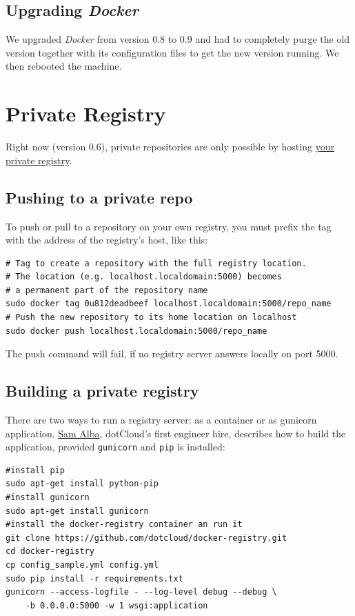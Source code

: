 \documentclass[captions=tableheading]{article}
\begin{document}
\subsection{Upgrading \emph{Docker}}
\label{sec-2-6}

We upgraded \emph{Docker} from version 0.8 to 0.9 and had to completely purge the old version together with its configuration files to get the new version running. We then rebooted the machine. 
\section{Private Registry}
\label{sec-3}

Right now (version 0.6), private repositories are only possible by hosting \href{https://github.com/dotcloud/docker-registry}{your private registry}. 
\subsection{Pushing to a private repo}
\label{sec-3-1}

To push or pull to a repository on your own registry, you must prefix the tag with the address of the registry’s host, like this:

\begin{verbatim}
# Tag to create a repository with the full registry location.
# The location (e.g. localhost.localdomain:5000) becomes
# a permanent part of the repository name
sudo docker tag 0u812deadbeef localhost.localdomain:5000/repo_name
# Push the new repository to its home location on localhost
sudo docker push localhost.localdomain:5000/repo_name
\end{verbatim}
The push command will fail, if no registry server answers locally on port 5000.
\subsection{Building a private registry}
\label{sec-3-2}

There are two ways to run a registry server: as a container or as gunicorn application. \href{http://blog.docker.io/2013/07/how-to-use-your-own-registry/}{Sam Alba}, dotCloud's first engineer hire, describes how to build the application, provided \texttt{gunicorn} and \texttt{pip} is installed:

\begin{verbatim}
#install pip 
sudo apt-get install python-pip
#install gunicorn
sudo apt-get install gunicorn
#install the docker-registry container an run it
git clone https://github.com/dotcloud/docker-registry.git
cd docker-registry
cp config_sample.yml config.yml
sudo pip install -r requirements.txt
gunicorn --access-logfile - --log-level debug --debug \
    -b 0.0.0.0:5000 -w 1 wsgi:application
\end{verbatim}
\end{document}
